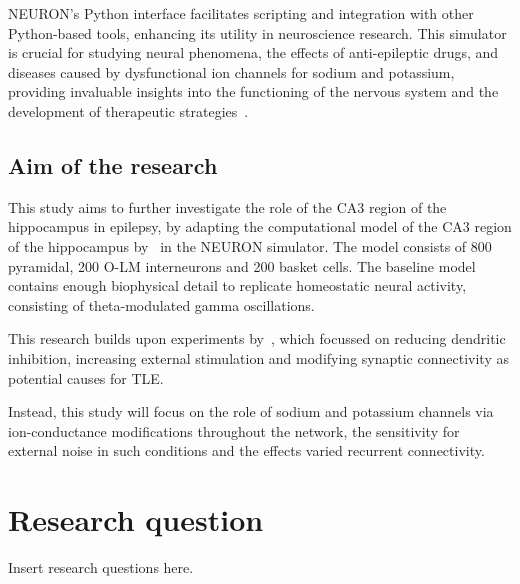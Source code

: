 NEURON's Python interface facilitates scripting and integration 
with other Python-based tools, enhancing its utility in neuroscience research.
This simulator is crucial for studying neural phenomena, the effects of 
anti-epileptic drugs, and diseases caused by dysfunctional ion channels for sodium and potassium, 
providing invaluable insights into the functioning of the nervous system 
and the development of therapeutic strategies~\parencite{miglioreParallelNetworkSimulations2006}.

\subsection{Aim of the research}
This study aims to further investigate the role of the CA3 region of the hippocampus in epilepsy, 
by adapting the computational model of the CA3 region of the hippocampus by~\textcite{neymotinKetamineDisruptsTheta2011} in the NEURON simulator.
The model consists of 800 pyramidal, 200 O-LM interneurons and 200 basket cells. 
The baseline model contains enough biophysical detail to replicate homeostatic neural activity, consisting of theta-modulated gamma oscillations.

This research builds upon experiments by~\textcite{sanjayImpairedDendriticInhibition2015}, 
which focussed on reducing dendritic inhibition, increasing external stimulation and modifying synaptic connectivity as potential causes for TLE\@.

Instead, this study will focus on the role of sodium and potassium channels via ion-conductance modifications throughout the network, 
the sensitivity for external noise in such conditions and the effects varied recurrent connectivity.

\section{Research question}
Insert research questions here.